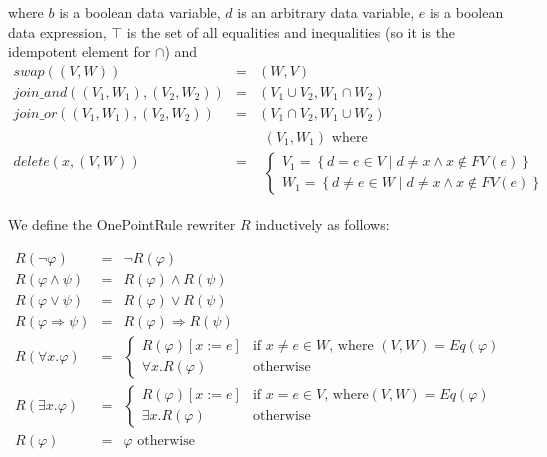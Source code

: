\documentclass{article}
\begin{document}
where $b$ is a boolean data variable, $d$ is an arbitrary data variable, $e$
is a boolean data expression, $\top$ is the set of all equalities and
inequalities (so it is the idempotent element for $\cap$) and%
\begin{equation*}
\begin{array}{lll}
swap\left( \left( V,W\right) \right) & = & \left( W,V\right) \\
join\_and\left( \left( V_{1},W_{1}\right) ,\left( V_{2},W_{2}\right) \right)
& = & \left( V_{1}\cup V_{2},W_{1}\cap W_{2}\right) \\
join\_or\left( \left( V_{1},W_{1}\right) ,\left( V_{2},W_{2}\right) \right)
& = & \left( V_{1}\cap V_{2},W_{1}\cup W_{2}\right) \\
delete\left( x,\left( V,W\right) \right) & = &
\begin{array}{l}
\left( V_{1},W_{1}\right) \text{ where} \\
\left\{
\begin{array}{c}
V_{1}=\left\{ d=e\in V\mid d\neq x\wedge x\notin FV(e)\right\} \\
W_{1}=\left\{ d\neq e\in W\mid d\neq x\wedge x\notin FV(e)\right\}%
\end{array}%
\right.%
\end{array}%
\end{array}%
\end{equation*}

We define the OnePointRule rewriter $R$ inductively as follows:

\begin{equation*}
\begin{array}{lll}
R\left( \lnot \varphi \right) & = & \lnot R\left( \varphi \right) \\
R\left( \varphi \wedge \psi \right) & = & R\left( \varphi \right) \wedge
R\left( \psi \right) \\
R\left( \varphi \vee \psi \right) & = & R\left( \varphi \right) \vee R\left(
\psi \right) \\
R\left( \varphi \Rightarrow \psi \right) & = & R\left( \varphi \right)
\Rightarrow R\left( \psi \right) \\
R\left( \forall x.\varphi \right) & = & \left\{
\begin{array}{cc}
R\left( \varphi \right) \left[ x:=e\right] & \text{if }x\neq e\in W\text{,
where }\left( V,W\right) =Eq\left( \varphi \right) \\
\forall x.R\left( \varphi \right) & \text{otherwise}%
\end{array}%
\right. \\
R\left( \exists x.\varphi \right) & = & \left\{
\begin{array}{cc}
R\left( \varphi \right) \left[ x:=e\right] & \text{if }x=e\in V\text{, where
}\left( V,W\right) =Eq\left( \varphi \right) \\
\exists x.R\left( \varphi \right) & \text{otherwise}%
\end{array}%
\right. \\
R\left( \varphi \right) & = & \varphi \text{ otherwise}%
\end{array}%
\end{equation*}
\end{document}
